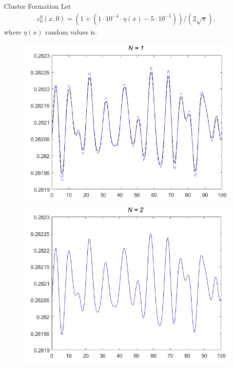 \begin{frame}{Cluster Formation}
	\scriptsize
	Let 
	\begin{align*}
		c^0_0 (x,0) = (1+(1\cdot10^{-4} \cdot \eta(x)-5\cdot10^{-5}))/(2\sqrt{\pi}),
	\end{align*}
	where $\eta(x)$ random values is.
	
	\begin{figure}
		\centering
		\begin{minipage}{0.46\textwidth}
			\includegraphics[width=\textwidth]{Bilder_wx/ClusterFormation/N=1vsN=6_Dr=0.05_mx=8192}
		\end{minipage}
		\hfill
		\begin{minipage}{0.46\textwidth}
			\includegraphics[width=\textwidth]{Bilder_wx/ClusterFormation/N=2vsN=6_Dr=0.05_mx=8192}

\end{minipage}
\end{figure}
\end{frame}
